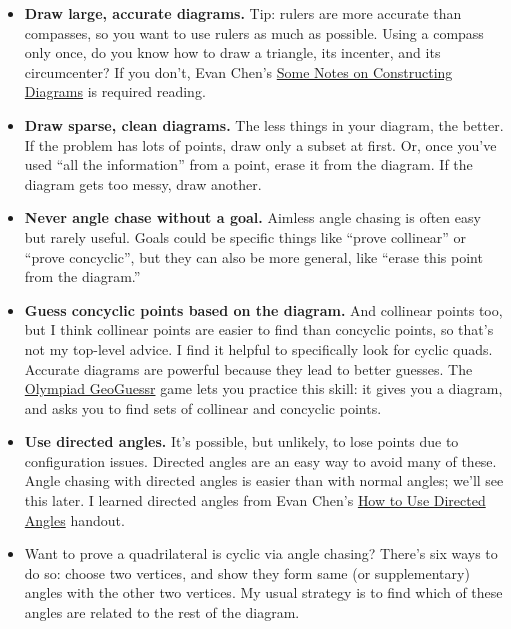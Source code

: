 \documentclass[11pt,paper=letter]{scrartcl}
\begin{document}
\begin{itemize}

\item \textbf{Draw large, accurate diagrams.} Tip: rulers are more accurate than compasses, so you want to use rulers as much as possible. Using a compass only once, do you know how to draw a triangle, its incenter, and its circumcenter? If you don't, Evan Chen's \href{https://web.evanchen.cc/handouts/Constructions/Constructions.pdf}{Some Notes on Constructing Diagrams} is required reading.

\item \textbf{Draw sparse, clean diagrams.} The less things in your diagram, the better. If the problem has lots of points, draw only a subset at first. Or, once you've used ``all the information'' from a point, erase it from the diagram. If the diagram gets too messy, draw another.

\item \textbf{Never angle chase without a goal.} Aimless angle chasing is often easy but rarely useful. Goals could be specific things like ``prove collinear'' or ``prove concyclic'', but they can also be more general, like ``erase this point from the diagram.''

\item \textbf{Guess concyclic points based on the diagram.} And collinear points too, but I think collinear points are easier to find than concyclic points, so that's not my top-level advice. I find it helpful to specifically look for cyclic quads. Accurate diagrams are powerful because they lead to better guesses. The \href{https://guessr.evanchen.cc/}{Olympiad GeoGuessr} game lets you practice this skill: it gives you a diagram, and asks you to find sets of collinear and concyclic points.

\item \textbf{Use directed angles.} It's possible, but unlikely, to lose points due to configuration issues. Directed angles are an easy way to avoid many of these. Angle chasing with directed angles is easier than with normal angles; we'll see this later. I learned directed angles from Evan Chen's \href{https://web.evanchen.cc/handouts/Directed-Angles/Directed-Angles.pdf}{How to Use Directed Angles} handout.

\item Want to prove a quadrilateral is cyclic via angle chasing? There's six ways to do so: choose two vertices, and show they form same (or supplementary) angles with the other two vertices. My usual strategy is to find which of these angles are related to the rest of the diagram.

\end{itemize}
\end{document}
